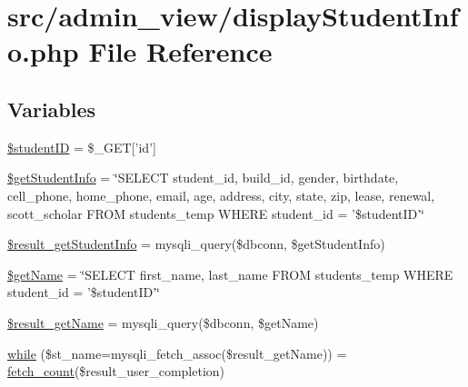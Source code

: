 \hypertarget{displayStudentInfo_8php}{\section{src/admin\-\_\-view/display\-Student\-Info.php \-File \-Reference}
\label{displayStudentInfo_8php}
}
\subsection*{\-Variables}
\begin{DoxyCompactItemize}
\item 
\hyperlink{displayStudentInfo_8php_af62eac6f1a6ea66c9f90093940147945}{\$student\-I\-D} = \$\-\_\-\-G\-E\-T\mbox{[}'id'\mbox{]}
\item 
\hyperlink{displayStudentInfo_8php_afacc031eed5b55847cdf634cbac8b9a6}{\$get\-Student\-Info} = \char`\"{}\-S\-E\-L\-E\-C\-T student\-\_\-id, build\-\_\-id, gender, birthdate, cell\-\_\-phone, home\-\_\-phone, email, age, address, city, state, zip, lease, renewal, scott\-\_\-scholar \-F\-R\-O\-M students\-\_\-temp \-W\-H\-E\-R\-E student\-\_\-id = '\$student\-I\-D'\char`\"{}
\item 
\hyperlink{displayStudentInfo_8php_ab8bbdcdd0fe4999997ee43345fd69dbe}{\$result\-\_\-get\-Student\-Info} = mysqli\-\_\-query(\$dbconn, \$get\-Student\-Info)
\item 
\hyperlink{displayStudentInfo_8php_a8475c55a95335ffc4309e9001d7d1fa3}{\$get\-Name} = \char`\"{}\-S\-E\-L\-E\-C\-T first\-\_\-name, last\-\_\-name \-F\-R\-O\-M students\-\_\-temp \-W\-H\-E\-R\-E student\-\_\-id = '\$student\-I\-D'\char`\"{}
\item 
\hyperlink{displayStudentInfo_8php_abf07436f24cd62ffb968c81f8bcbe272}{\$result\-\_\-get\-Name} = mysqli\-\_\-query(\$dbconn, \$get\-Name)
\item 
\hyperlink{displayStudentInfo_8php_a21986c98f8e5909ee2e102a3ff82fcc1}{while} (\$st\-\_\-name=mysqli\-\_\-fetch\-\_\-assoc(\$result\-\_\-get\-Name)) = \hyperlink{admin__view_2index_8php_ab37d59932fd6526f337d009f44f5ab2e}{fetch\-\_\-count}(\$result\-\_\-user\-\_\-completion)
\end{DoxyCompactItemize}


